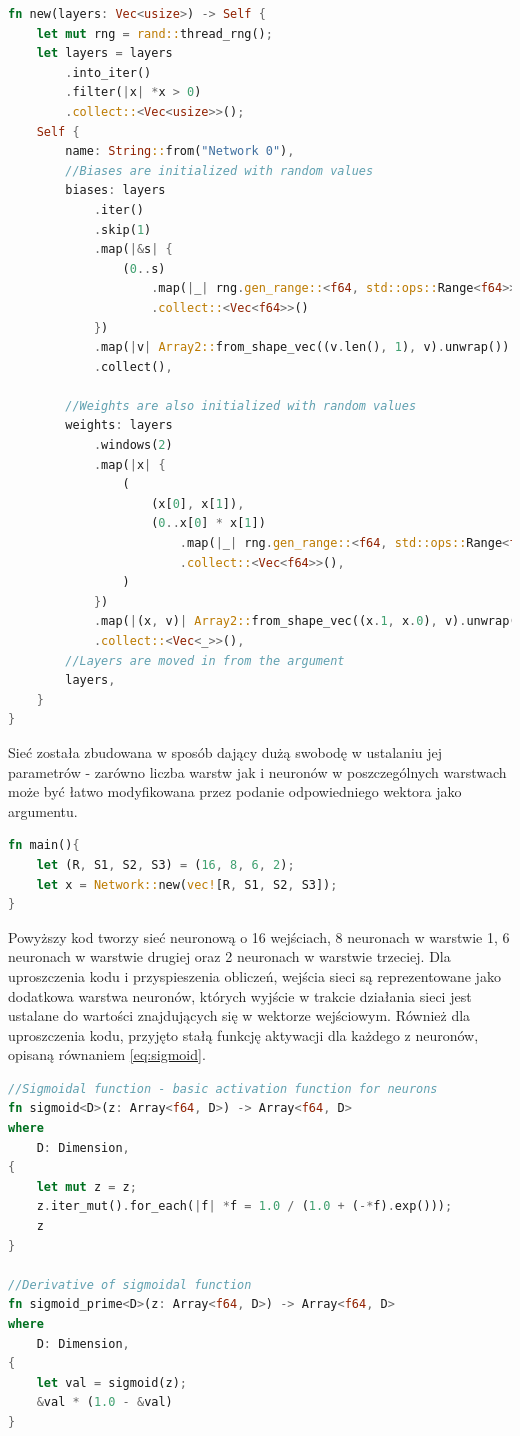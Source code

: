 \documentclass[12pt,twoside]{article}
\begin{document}
\begin{lstlisting}[language=Rust,caption=Konstruktor struktury sieci neuronowej,label={lst:netConstructor}]
fn new(layers: Vec<usize>) -> Self {
	let mut rng = rand::thread_rng();
	let layers = layers
		.into_iter()
		.filter(|x| *x > 0)
		.collect::<Vec<usize>>();
	Self {
		name: String::from("Network 0"),
		//Biases are initialized with random values
		biases: layers
			.iter()
			.skip(1)
			.map(|&s| {
				(0..s)
					.map(|_| rng.gen_range::<f64, std::ops::Range<f64>>(-1.0..1.0))
					.collect::<Vec<f64>>()
			})
			.map(|v| Array2::from_shape_vec((v.len(), 1), v).unwrap())
			.collect(),

		//Weights are also initialized with random values
		weights: layers
			.windows(2)
			.map(|x| {
				(
					(x[0], x[1]),
					(0..x[0] * x[1])
						.map(|_| rng.gen_range::<f64, std::ops::Range<f64>>(-1.0..1.0))
						.collect::<Vec<f64>>(),
				)
			})
			.map(|(x, v)| Array2::from_shape_vec((x.1, x.0), v).unwrap())
			.collect::<Vec<_>>(),
		//Layers are moved in from the argument
		layers,
	}
}

\end{lstlisting}

Sieć została zbudowana w sposób dający dużą swobodę w ustalaniu jej parametrów - zarówno liczba warstw jak i neuronów w poszczególnych warstwach może być łatwo modyfikowana przez podanie odpowiedniego wektora jako argumentu.


\begin{lstlisting}[language=Rust,caption=Utworzenie przykładowej struktury sieci,label={lst:netExample}]
fn main(){
	let (R, S1, S2, S3) = (16, 8, 6, 2);
	let x = Network::new(vec![R, S1, S2, S3]);
}
\end{lstlisting}

Powyższy kod tworzy sieć neuronową o 16 wejściach, 8 neuronach w warstwie 1, 6 neuronach w warstwie drugiej oraz 2 neuronach w warstwie trzeciej.
Dla uproszczenia kodu i przyspieszenia obliczeń, wejścia sieci są reprezentowane jako dodatkowa warstwa neuronów, których wyjście w trakcie działania sieci jest ustalane do wartości znajdujących się w wektorze wejściowym.
Również dla uproszczenia kodu, przyjęto stałą funkcję aktywacji dla każdego z neuronów, opisaną równaniem \ref{eq:sigmoid}.


\begin{lstlisting}[language=Rust,caption=Funkcja sigmoidalna oraz jej pochodna,label={lst:sigmoid}]
//Sigmoidal function - basic activation function for neurons
fn sigmoid<D>(z: Array<f64, D>) -> Array<f64, D>
where
    D: Dimension,
{
    let mut z = z;
    z.iter_mut().for_each(|f| *f = 1.0 / (1.0 + (-*f).exp()));
    z
}

//Derivative of sigmoidal function
fn sigmoid_prime<D>(z: Array<f64, D>) -> Array<f64, D>
where
    D: Dimension,
{
    let val = sigmoid(z);
    &val * (1.0 - &val)
}
\end{lstlisting}
\end{document}

